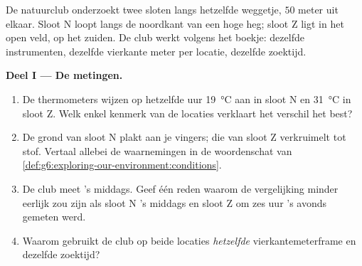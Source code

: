 \begin{problem}\label{pb:g6:exploring-our-environment:1}
De natuurclub onderzoekt twee sloten langs hetzelfde weggetje, $50$ meter
uit elkaar. Sloot N loopt langs de noordkant van een hoge heg; sloot Z
ligt in het open veld, op het zuiden. De club werkt volgens het boekje:
dezelfde instrumenten, dezelfde vierkante meter per locatie, dezelfde
zoektijd.

\medskip\noindent\textbf{Deel I --- De metingen.}
\begin{enumerate}
  \item De thermometers wijzen op hetzelfde uur \qty{19}{\degreeCelsius}
        aan in sloot N en \qty{31}{\degreeCelsius} in sloot Z. Welk
        enkel kenmerk van de locaties verklaart het verschil het best?
  \item De grond van sloot N plakt aan je vingers; die van sloot Z
        verkruimelt tot stof. Vertaal allebei de waarnemingen in de
        woordenschat van
        \cref{def:g6:exploring-our-environment:conditions}.
  \item De club meet 's middags. Geef één reden waarom de vergelijking
        minder eerlijk zou zijn als sloot N 's middags en sloot Z om
        zes uur 's avonds gemeten werd.
  \item Waarom gebruikt de club op beide locaties \emph{hetzelfde}
        vierkantemeterframe en dezelfde zoektijd?
\end{enumerate}


\end{problem}
